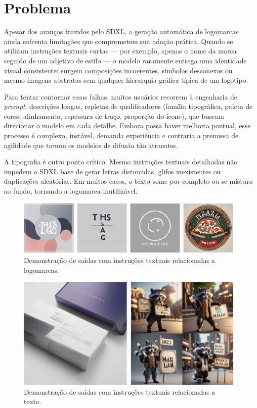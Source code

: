\documentclass[12pt, %
openright, 
oneside, %
a4paper,    %
brazil]{facom-ufu-abntex2}
\begin{document}
\section{Problema}

Apesar dos avanços trazidos pelo SDXL, a geração automática de logomarcas ainda enfrenta limitações que comprometem sua adoção prática. Quando se utilizam instruções textuais curtas — por exemplo, apenas o nome da marca seguido de um adjetivo de estilo — o modelo raramente entrega uma identidade visual consistente: surgem composições incoerentes, símbolos desconexos ou mesmo imagens abstratas sem qualquer hierarquia gráfica típica de um logotipo.

Para tentar contornar essas falhas, muitos usuários recorrem à engenharia de \emph{prompt}: descrições longas, repletas de qualificadores (família tipográfica, paleta de cores, alinhamento, espessura de traço, proporção do ícone), que buscam direcionar o modelo em cada detalhe. Embora possa haver melhoria pontual, esse processo é complexo, instável, demanda experiência e contraria a premissa de agilidade que tornou os modelos de difusão tão atraentes.

A tipografia é outro ponto crítico. Mesmo instruções textuais detalhadas não impedem o SDXL base de gerar letras distorcidas, glifos inexistentes ou duplicações aleatórias. Em muitos casos, o texto some por completo ou se mistura ao fundo, tornando a logomarca inutilizável.

\begin{figure}[H]
    \centering
	\includegraphics[width=\linewidth]{figuras/problem-1.png}
	\caption{Demonstração de saídas com instruções textuais relacionadas a logomarcas.}
	\label{fig:problem1}
\end{figure}

\begin{figure}[H]
    \centering
	\includegraphics[width=0.8\linewidth]{figuras/problem-3.png}
	\caption{Demonstração de saídas com instruções textuais relacionadas a texto.}
	\label{fig:problem2}
\end{figure}
\end{document}
